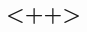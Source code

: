 \documentclass[paper=a4,fontsize=14pt]{scrreprt}
\begin{document}
\pagestyle{Aplain} %
\color{soYellow}
\renewcommand\footnoterule{\color{soWhite} \kern-3pt \hrule width 0.4\columnwidth \kern 2.6pt}


\begin{spacing}{1}
	\section{<++>}
\end{spacing}
\end{document}
